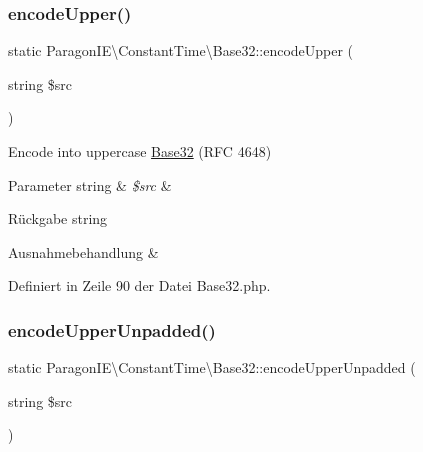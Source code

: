 \mbox{\label{class_paragon_i_e_1_1_constant_time_1_1_base32_a80ad7226938f9bf180633489ad5b97b3}} 
\subsubsection{\texorpdfstring{encode\+Upper()}{encodeUpper()}}
{\footnotesize\ttfamily static Paragon\+I\+E\textbackslash{}\+Constant\+Time\textbackslash{}\+Base32\+::encode\+Upper (\begin{DoxyParamCaption}\item[{string}]{\$src }\end{DoxyParamCaption})\hspace{0.3cm}{\ttfamily [static]}}

Encode into uppercase \mbox{\hyperlink{class_paragon_i_e_1_1_constant_time_1_1_base32}{Base32}} (R\+FC 4648)


\begin{DoxyParams}[1]{Parameter}
string & {\em \$src} & \\
\hline
\end{DoxyParams}
\begin{DoxyReturn}{Rückgabe}
string 
\end{DoxyReturn}

\begin{DoxyExceptions}{Ausnahmebehandlung}
{\em } & \\
\hline
\end{DoxyExceptions}


Definiert in Zeile 90 der Datei Base32.\+php.

\mbox{\label{class_paragon_i_e_1_1_constant_time_1_1_base32_ade34e06da009cc022f1fcc26e4953fe4}} 
\subsubsection{\texorpdfstring{encode\+Upper\+Unpadded()}{encodeUpperUnpadded()}}
{\footnotesize\ttfamily static Paragon\+I\+E\textbackslash{}\+Constant\+Time\textbackslash{}\+Base32\+::encode\+Upper\+Unpadded (\begin{DoxyParamCaption}\item[{string}]{\$src }\end{DoxyParamCaption})\hspace{0.3cm}{\ttfamily [static]}}

